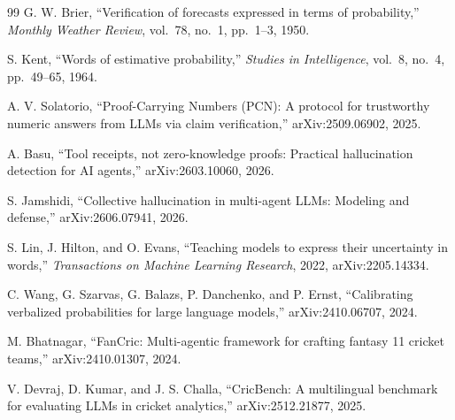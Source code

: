 \documentclass[11pt,a4paper]{article}
\begin{document}
\begin{thebibliography}{99}
G. W. Brier, ``Verification of forecasts expressed in terms of probability,''
\emph{Monthly Weather Review}, vol.~78, no.~1, pp.~1--3, 1950.

S. Kent, ``Words of estimative probability,'' \emph{Studies in Intelligence},
vol.~8, no.~4, pp.~49--65, 1964.

A. V. Solatorio, ``Proof-Carrying Numbers (PCN): A protocol for trustworthy
numeric answers from LLMs via claim verification,'' arXiv:2509.06902, 2025.

A. Basu, ``Tool receipts, not zero-knowledge proofs: Practical hallucination
detection for AI agents,'' arXiv:2603.10060, 2026.

S. Jamshidi, ``Collective hallucination in multi-agent LLMs: Modeling and
defense,'' arXiv:2606.07941, 2026.

S. Lin, J. Hilton, and O. Evans, ``Teaching models to express their
uncertainty in words,'' \emph{Transactions on Machine Learning Research}, 2022,
arXiv:2205.14334.

C. Wang, G. Szarvas, G. Balazs, P. Danchenko, and P. Ernst, ``Calibrating
verbalized probabilities for large language models,'' arXiv:2410.06707, 2024.

M. Bhatnagar, ``FanCric: Multi-agentic framework for crafting fantasy 11
cricket teams,'' arXiv:2410.01307, 2024.

V. Devraj, D. Kumar, and J. S. Challa, ``CricBench: A multilingual benchmark
for evaluating LLMs in cricket analytics,'' arXiv:2512.21877, 2025.

\end{thebibliography}
\end{document}
